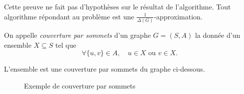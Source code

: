 \begin{rmk}
	Cette preuve ne fait pas d'hypothèses sur le résultat de l'algorithme. Tout algorithme répondant au problème est une $\frac{1}{\Delta(G)}$-approximation.
\end{rmk}

\begin{exmk}
	On appelle \textit{couverture par sommets} d'un graphe $G = (S,A)$\/ la donnée d'un ensemble $X \subseteq S$\/ tel que \[
		\forall \{u,v\} \in A,\quad u \in X \text{ ou } v \in X
	.\]
	\begin{exm}
		L'ensemble {} est une couverture par sommets du graphe ci-dessous.
		\begin{figure}[H]
			\centering
			\caption{Exemple de couverture par sommets}
		\end{figure}
	\end{exm}


\end{exmk}
